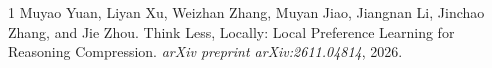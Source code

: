 \documentclass[11pt,a4paper]{article}
\begin{document}

\begin{thebibliography}{1}
Muyao Yuan, Liyan Xu, Weizhan Zhang, Muyan Jiao, Jiangnan Li, Jinchao Zhang, and Jie Zhou.
\newblock Think Less, Locally: Local Preference Learning for Reasoning Compression.
\newblock \emph{arXiv preprint arXiv:2611.04814}, 2026.
\end{thebibliography}
\end{document}
